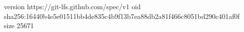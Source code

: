 version https://git-lfs.github.com/spec/v1
oid sha256:16440b4e5e01511bb4de835c4b9f13b7ea88db2a81f466c8051bd290c401af0f
size 25671
